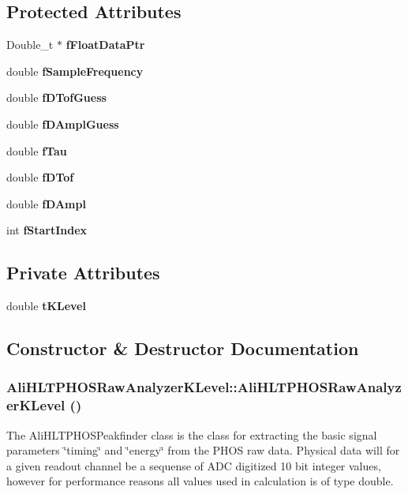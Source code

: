 \subsection*{Protected Attributes}
\begin{CompactItemize}
\item 
Double\_\-t $\ast$ {\bf f\-Float\-Data\-Ptr}
\item 
double {\bf f\-Sample\-Frequency}
\item 
double {\bf f\-DTof\-Guess}
\item 
double {\bf f\-DAmpl\-Guess}
\item 
double {\bf f\-Tau}
\item 
double {\bf f\-DTof}
\item 
double {\bf f\-DAmpl}
\item 
int {\bf f\-Start\-Index}
\end{CompactItemize}
\subsection*{Private Attributes}
\begin{CompactItemize}
\item 
double {\bf t\-KLevel}
\end{CompactItemize}


\subsection{Constructor \& Destructor Documentation}
\subsubsection{\setlength{\rightskip}{0pt plus 5cm}Ali\-HLTPHOSRaw\-Analyzer\-KLevel::Ali\-HLTPHOSRaw\-Analyzer\-KLevel ()}\label{classAliHLTPHOSRawAnalyzerKLevel_AliHLTPHOSRawAnalyzerKLevela0}


The Ali\-HLTPHOSPeakfinder class is the class for extracting the basic signal parameters \char`\"{}timing\char`\"{} and \char`\"{}energy\char`\"{} from the PHOS raw data. Physical data will for a given readout channel be a sequense of ADC digitized 10 bit integer values, however for performance reasons all values used in calculation is of type double. 


